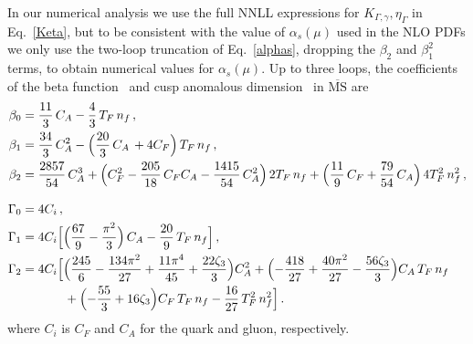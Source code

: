 \documentclass[a4,letterpaper,11pt]{article}
\newcommand{\nn}{\nonumber}
\newcommand{\as}{\alpha_s}
\newcommand{\eq}[1]{Eq.~\eqref{#1}}
\begin{document}
In our numerical analysis we use the full NNLL expressions for $K_{\Gamma,\gamma},\eta_\Gamma$ in \eq{Keta}, but to be consistent with the value of $\as(\mu)$ used in the NLO PDFs we only use the two-loop truncation of \eq{alphas}, dropping the $\beta_2$ and $\beta_1^2$ terms, to obtain numerical values for $\as(\mu)$. 
Up to three loops, the coefficients of the beta function~\cite{Tarasov:1980au, Larin:1993tp} and cusp anomalous dimension~\cite{Korchemsky:1987wg, Moch:2004pa} in $\overline{\mathrm{MS}}$ are
\begin{align} \label{Gacuspexp}
\beta_0 &= \frac{11}{3}\,C_A -\frac{4}{3}\,T_F\,n_f
\,,\nn\\
\beta_1 &= \frac{34}{3}\,C_A^2  - \Bigl(\frac{20}{3}\,C_A\, + 4 C_F\Bigr)\, T_F\,n_f
\,, \nn\\
\beta_2 &=
\frac{2857}{54}\,C_A^3 + \Bigl(C_F^2 - \frac{205}{18}\,C_F C_A
 - \frac{1415}{54}\,C_A^2 \Bigr)\, 2T_F\,n_f
 + \Bigl(\frac{11}{9}\, C_F + \frac{79}{54}\, C_A \Bigr)\, 4T_F^2\,n_f^2
\,,\nn\\[2ex]
\Gamma_0 &= 4C_i
\,,\nn\\
\Gamma_1 &= 4C_i \Bigl[\Bigl( \frac{67}{9} -\frac{\pi^2}{3} \Bigr)\,C_A  -
   \frac{20}{9}\,T_F\, n_f \Bigr]
\,,\nn\\
\Gamma_2 &= 4C_i \Bigl[
\Bigl(\frac{245}{6} -\frac{134 \pi^2}{27} + \frac{11 \pi ^4}{45}
  + \frac{22 \zeta_3}{3}\Bigr)C_A^2 
  + \Bigl(- \frac{418}{27} + \frac{40 \pi^2}{27}  - \frac{56 \zeta_3}{3} \Bigr)C_A\, T_F\,n_f
\nn\\* & \hspace{8ex}
  + \Bigl(- \frac{55}{3} + 16 \zeta_3 \Bigr) C_F\, T_F\,n_f
  - \frac{16}{27}\,T_F^2\, n_f^2 \Bigr]
\,.\end{align}
where $C_i$ is $C_F$ and $C_A$ for the quark and gluon, respectively.


\end{document}
